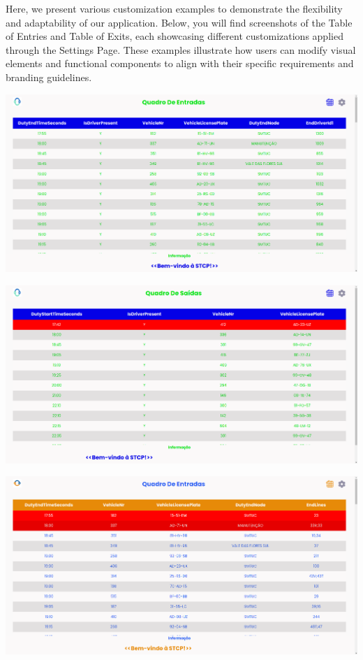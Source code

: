 \documentclass[10pt]{article}
\begin{document}
        Here, we present various customization examples to demonstrate the flexibility and adaptability of our application. Below, you will find screenshots of the Table of Entries and Table of Exits, each showcasing different customizations applied through the Settings Page. These examples illustrate how users can modify visual elements and functional components to align with their specific requirements and branding guidelines.

            \vfill
        \includegraphics[width=1\textwidth]{table_of_entries_stcp1}
            \vfill

            \vfill
        \includegraphics[width=1\textwidth]{table_of_exits_stcp1}
            \vfill

            \vfill
        \includegraphics[width=1\textwidth]{table_of_entries_stcp2}
            \vfill
\end{document}
